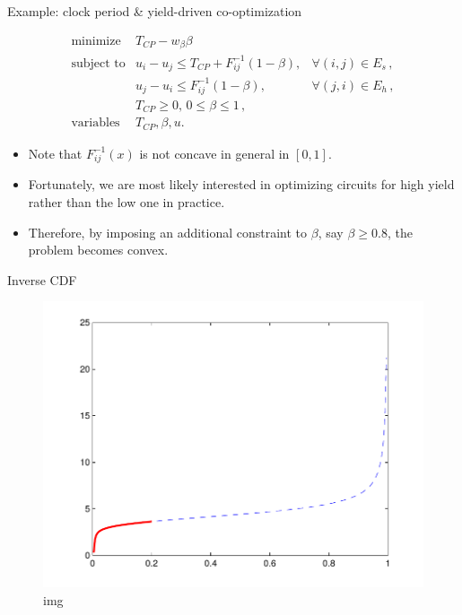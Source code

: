 \documentclass[10pt,ignorenonframetext,serif,onlymath]{beamer}
\providecommand{\tightlist}{%
  \setlength{\itemsep}{0pt}\setlength{\parskip}{0pt}}
\begin{document}
\begin{frame}{Example: clock period \& yield-driven co-optimization}
\protect\hypertarget{sec:example-clock-period-yield-driven-co-optimization}{}

\[\begin{array}{cll}
   \text{minimize} &T_{CP} - w_{\beta}\beta \\
   \text{subject to} & u_i - u_j \le T_{CP} + F_{ij}^{-1}(1-\beta), & \forall (i,j) \in E_s \,,\\
                     & u_j - u_i \le F_{ij}^{-1}(1-\beta), & \forall (j,i) \in E_h \,, \\
                     & T_{CP} \ge 0, \, 0 \le \beta \le 1 \, , \\
    \text{variables} &T_{CP},\beta, u.
   \end{array}\]

\begin{itemize}
\tightlist
\item
  Note that \(F_{ij}^{-1}(x)\) is not concave in general in \([0,1]\).
\item
  Fortunately, we are most likely interested in optimizing circuits for
  high yield rather than the low one in practice.
\item
  Therefore, by imposing an additional constraint to \(\beta\), say
  \(\beta \geq 0.8\), the problem becomes convex.
\end{itemize}

\end{frame}

\begin{frame}{Inverse CDF}
\protect\hypertarget{sec:inverse-cdf}{}

\begin{figure}
\centering
\includegraphics{ellipsoid.files/Fig2-b-invcdf.pdf}
\caption{img}
\end{figure}

\end{frame}
\end{document}
